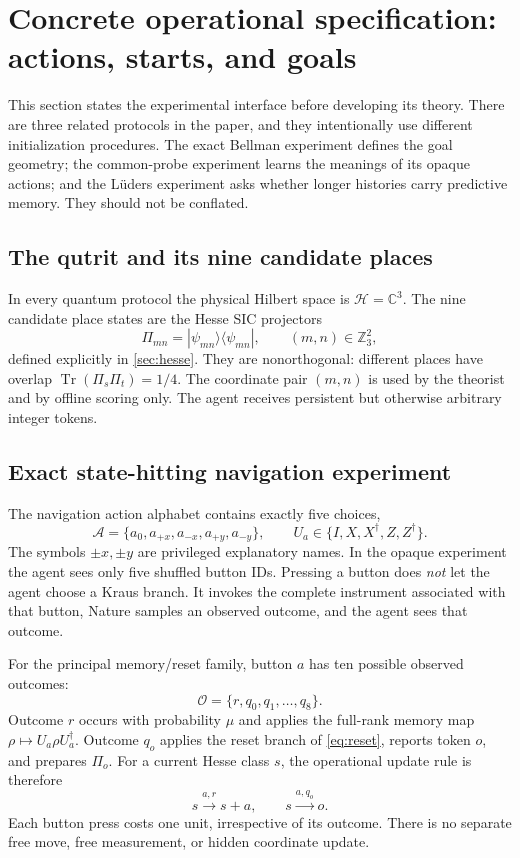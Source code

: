 \documentclass[11pt]{article}
\theoremstyle{definition}
\theoremstyle{remark}
\begin{document}
\section{Concrete operational specification: actions, starts, and goals}
\label{sec:protocol}

This section states the experimental interface before developing its theory.
There are three related protocols in the paper, and they intentionally use
different initialization procedures.  The exact Bellman experiment defines
the goal geometry; the common-probe experiment learns the meanings of its
opaque actions; and the Lüders experiment asks whether longer histories carry
predictive memory.  They should not be conflated.

\subsection{The qutrit and its nine candidate places}

In every quantum protocol the physical Hilbert space is
\(\mathcal H=\mathbb C^3\).  The nine candidate place states are the Hesse SIC
projectors
\[
 \Pi_{mn}=|\psi_{mn}\rangle\langle\psi_{mn}|,
 \qquad (m,n)\in\mathbb Z_3^2,
\]
defined explicitly in \cref{sec:hesse}.  They are nonorthogonal: different
places have overlap \(\operatorname{Tr}(\Pi_s\Pi_t)=1/4\).  The coordinate
pair \((m,n)\) is used by the theorist and by offline scoring only.  The agent
receives persistent but otherwise arbitrary integer tokens.

\subsection{Exact state-hitting navigation experiment}
\label{sec:exact-protocol}

The navigation action alphabet contains exactly five choices,
\begin{equation}
 \mathcal A=\{a_0,a_{+x},a_{-x},a_{+y},a_{-y}\},
 \qquad
 U_a\in\{I,X,X^\dagger,Z,Z^\dagger\}.
 \label{eq:action-alphabet}
\end{equation}
The symbols \(\pm x,\pm y\) are privileged explanatory names.  In the opaque
experiment the agent sees only five shuffled button IDs.  Pressing a button
does \emph{not} let the agent choose a Kraus branch.  It invokes the complete
instrument associated with that button, Nature samples an observed outcome,
and the agent sees that outcome.

For the principal memory/reset family, button \(a\) has ten possible observed
outcomes:
\[
 \mathcal O=\{r,q_0,q_1,\ldots,q_8\}.
\]
Outcome \(r\) occurs with probability \(\mu\) and applies the full-rank memory
map \(\rho\mapsto U_a\rho U_a^\dagger\).  Outcome \(q_o\) applies the reset
branch of \cref{eq:reset}, reports token \(o\), and prepares \(\Pi_o\).
For a current Hesse class \(s\), the operational update rule is therefore
\begin{equation}
 s\xrightarrow{a,r}s+a,
 \qquad
 s\xrightarrow{a,q_o}o.
 \label{eq:token-update}
\end{equation}
Each button press costs one unit, irrespective of its outcome.  There is no
separate free move, free measurement, or hidden coordinate update.
\end{document}
